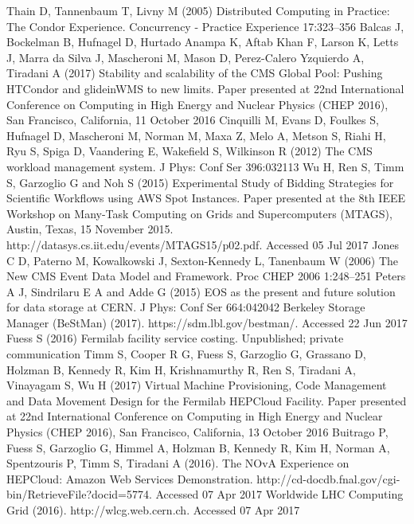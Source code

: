 \documentclass[twocolumn]{svjour3}          %
\begin{document}
\begin{thebibliography}{15}
 Thain D, Tannenbaum T, Livny M (2005) Distributed Computing in Practice: The Condor Experience. Concurrency - Practice Experience 17:323--356
 Balcas J, Bockelman B, Hufnagel D, Hurtado Anampa K, Aftab Khan F, Larson K, Letts J, Marra da Silva J, Mascheroni M,
Mason D, Perez-Calero Yzquierdo A, Tiradani A (2017) Stability and scalability of the CMS Global Pool: Pushing HTCondor and glideinWMS
to new limits. Paper presented at 22nd International Conference on Computing in High Energy and Nuclear Physics (CHEP 2016), San Francisco, California, 11 October 2016 %
 Cinquilli M, Evans D, Foulkes S, Hufnagel D, Mascheroni M, Norman M, Maxa Z, Melo A, Metson S, Riahi H, Ryu S, Spiga D, Vaandering E, Wakefield S, Wilkinson R (2012) The CMS workload
management system. J Phys: Conf Ser 396:032113
 Wu H, Ren S, Timm S, Garzoglio G and Noh S (2015) Experimental Study of Bidding Strategies for Scientific Workflows using AWS Spot Instances. Paper presented at the 8th
IEEE Workshop on Many-Task Computing on Grids and Supercomputers (MTAGS), Austin, Texas, 15 November 2015. http://datasys.cs.iit.edu/events/MTAGS15/p02.pdf. Accessed 05 Jul 2017
 Jones C D, Paterno M, Kowalkowski J, Sexton-Kennedy L, Tanenbaum W (2006) The New CMS Event Data Model and Framework. Proc CHEP 2006 1:248--251
 Peters A J, Sindrilaru E A and Adde G (2015) EOS as the present and future solution for data storage at CERN. J Phys: Conf Ser 664:042042
 Berkeley Storage Manager (BeStMan) (2017). https://sdm.lbl.gov/bestman/. Accessed 22 Jun 2017
 Fuess S (2016) Fermilab facility service costing. Unpublished; private communication
 Timm S, Cooper R G, Fuess S, Garzoglio G, Grassano D, Holzman B, Kennedy R, Kim H, Krishnamurthy R, Ren S, Tiradani A, Vinayagam S, Wu H (2017) Virtual Machine Provisioning, Code Management and Data Movement Design for the Fermilab HEPCloud Facility. 
Paper presented at 22nd International Conference on Computing in High Energy and Nuclear Physics (CHEP 2016), San Francisco, California, 13 October 2016 %
 Buitrago P, Fuess S, Garzoglio G, Himmel A, Holzman B, Kennedy R, Kim H, Norman A, Spentzouris P, Timm S, Tiradani A (2016). The NOvA Experience on HEPCloud: Amazon Web
Services Demonstration. http://cd-docdb.fnal.gov/cgi-bin/RetrieveFile?docid=5774. Accessed 07 Apr 2017
 Worldwide LHC Computing Grid (2016). http://wlcg.web.cern.ch. Accessed 07 Apr 2017
\end{thebibliography}
\end{document}
